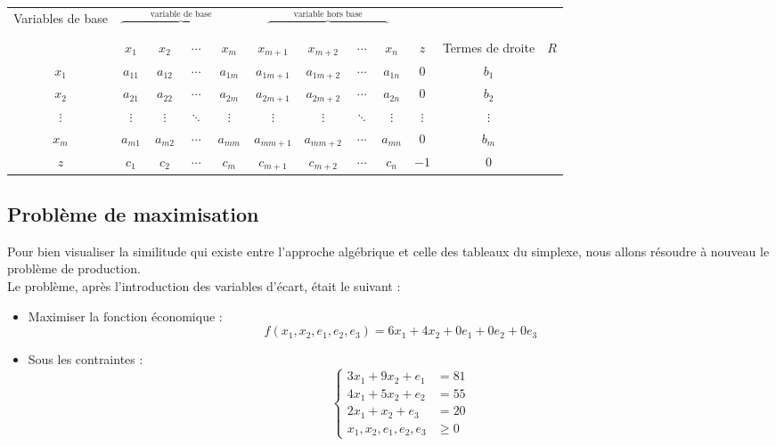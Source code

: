 \documentclass[a4paper,12pt,openany]{book}
\theoremstyle{plain}
\theoremstyle{definition}
\theoremstyle{remark}
\theoremstyle{nbstyle}
\begin{document}
	
	\begin{center}
		\begin{tabular}{c|ccccccccc|c|c}
			\toprule
			Variables de base & \multicolumn{4}{c}{$\overbrace{\phantom{xxxxxxxxxxxxxxxxx}}^{\text{variable de base}}$} & \multicolumn{4}{c}{$\overbrace{\phantom{xxxxxxxxxxxxxxxxx}}^{\text{variable hors base}}$}& & & \\
			& $x_1$ & $x_2$ & $\cdots$ & $x_m$ & $x_{m+1}$ & $x_{m+2}$ & $\cdots$ & $x_n$ & $z$ & Termes de droite & $R$ \\
			\midrule
			$x_1$ & $a_{11}$ & $a_{12}$ & $\cdots$ & $a_{1m}$ & $a_{1m+1}$ & $a_{1m+2}$ & $\cdots$ & $a_{1n}$ & 0 & $b_1$ &\\
			$x_2$ & $a_{21}$ & $a_{22}$ & $\cdots$ & $a_{2m}$ & $a_{2m+1}$ & $a_{2m+2}$ & $\cdots$ & $a_{2n}$ & 0 & $b_2$ &\\
			$\vdots$ & $\vdots$ & $\vdots$ & $\ddots$ & $\vdots$ & $\vdots$ & $\vdots$ & $\ddots$ & $\vdots$ & $\vdots$ & $\vdots$& \\
			$x_m$ & $a_{m1}$ & $a_{m2}$ & $\cdots$ & $a_{mm}$ & $a_{mm+1}$ & $a_{mm+2}$ & $\cdots$ & $a_{mn}$ & 0 & $b_m$ &\\
			\hline
			$z$ & $c_1$ & $c_2$ & $\cdots$ & $c_m$ & $c_{m+1}$ & $c_{m+2}$ & $\cdots$ & $c_n$ & $-1$ & 0& \\
			\hline
		\end{tabular}
	\end{center}
	
	\subsection{Problème de maximisation}
	Pour bien visualiser la similitude qui existe entre l'approche algébrique et celle des tableaux du simplexe, nous allons résoudre à nouveau le problème de production.\\
	
	Le problème, après l'introduction des variables d'écart, était le suivant :
	
	\begin{itemize}
		\item Maximiser la fonction économique :
		\[
		f(x_{1}, x_{2}, e_{1}, e_{2}, e_{3}) = 6x_{1} + 4x_{2} + 0e_{1} + 0e_{2} + 0e_{3}
		\]
		\item Sous les contraintes :
		\[
		\left\{
		\begin{aligned}
		3x_{1} + 9x_{2} + e_{1} &= 81 \\
		4x_{1} + 5x_{2} + e_{2} &= 55 \\
		2x_{1} + x_{2} + e_{3} &= 20 \\
		x_{1}, x_{2}, e_{1}, e_{2}, e_{3} &\geq 0
		\end{aligned}
		\right.
		\]
	\end{itemize}
	
\end{document}
